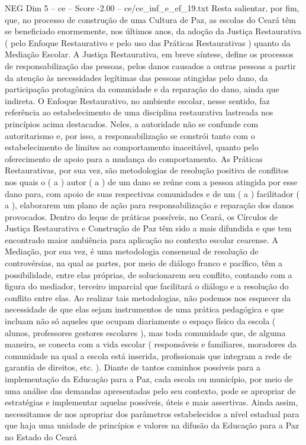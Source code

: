 \begin{textsample}{NEG Dim 5 – ce – Score -2.00 – ce/ce\_inf\_e\_ef\_19.txt}
Resta salientar, por fim, que, no processo de construção de uma Cultura de Paz, as escolas do Ceará têm se beneficiado enormemente, nos últimos anos, da adoção da Justiça Restaurativa ( pelo Enfoque Restaurativo e pelo uso das Práticas Restaurativas ) quanto da Mediação Escolar.
A Justiça Restaurativa, em breve síntese, define os processos de responsabilização das pessoas, pelos danos causados a outras pessoas a partir da atenção às necessidades legítimas das pessoas atingidas pelo dano, da participação protagônica da comunidade e da reparação do dano, ainda que indireta.
O Enfoque Restaurativo, no ambiente escolar, nesse sentido, faz referência ao estabelecimento de uma disciplina restaurativa lastreada nos princípios acima destacados.
Neles, a autoridade não se confunde com autoritarismo e, por isso, a responsabilização se constrói tanto com o estabelecimento de limites ao comportamento inaceitável, quanto pelo oferecimento de apoio para a mudança do comportamento.
As Práticas Restaurativas, por sua vez, são metodologias de resolução positiva de conflitos nos quais o ( a ) autor ( a ) de um dano se reúne com a pessoa atingida por esse dano para, com apoio de suas respectivas comunidades e de um ( a ) facilitador ( a ), elaborarem um plano de ação para responsabilização e reparação dos danos provocados.
Dentro do leque de práticas possíveis, no Ceará, os Círculos de Justiça Restaurativa e Construção de Paz têm sido a mais difundida e que tem encontrado maior ambiência para aplicação no contexto escolar cearense.
A Mediação, por sua vez, é uma metodologia consensual de resolução de controvérsias, na qual as partes, por meio de diálogo franco e pacífico, têm a possibilidade, entre elas próprias, de solucionarem seu conflito, contando com a figura do mediador, terceiro imparcial que facilitará o diálogo e a resolução do conflito entre elas.
Ao realizar tais metodologias, não podemos nos esquecer da necessidade de que elas sejam instrumentos de uma prática pedagógica e que incluam não só aqueles que ocupam diariamente o espaço físico da escola ( alunos, professores gestores escolares ), mas toda comunidade que, de alguma maneira, se conecta com a vida escolar ( responsáveis e familiares, moradores da comunidade na qual a escola está inserida, profissionais que integram a rede de garantia de direitos, etc. ).
Diante de tantos caminhos possíveis para a implementação da Educação para a Paz, cada escola ou município, por meio de uma análise das demandas apresentadas pelo seu contexto, pode se apropriar de estratégias e implementar aquelas possíveis, úteis e mais assertivas.
Ainda assim, necessitamos de nos apropriar dos parâmetros estabelecidos a nível estadual para que haja uma unidade de princípios e valores na difusão da Educação para a Paz no Estado do Ceará

\end{textsample}
